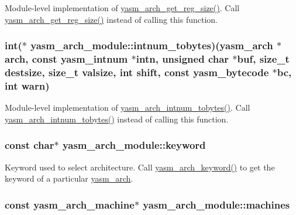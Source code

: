Module-\/level implementation of \hyperlink{arch_8h_a028fd6b5698ea232ca602915d067cd64}{yasm\-\_\-arch\-\_\-get\-\_\-reg\-\_\-size()}. Call \hyperlink{arch_8h_a028fd6b5698ea232ca602915d067cd64}{yasm\-\_\-arch\-\_\-get\-\_\-reg\-\_\-size()} instead of calling this function. \hypertarget{structyasm__arch__module_a07202501842115d0216311060c3ede71}{
\subsubsection[{intnum\-\_\-tobytes}]{\setlength{\rightskip}{0pt plus 5cm}int($\ast$ yasm\-\_\-arch\-\_\-module\-::intnum\-\_\-tobytes)({\bf yasm\-\_\-arch} $\ast$arch, const {\bf yasm\-\_\-intnum} $\ast$intn, unsigned char $\ast$buf, size\-\_\-t destsize, size\-\_\-t valsize, int shift, const {\bf yasm\-\_\-bytecode} $\ast$bc, int {\bf warn})}}\label{structyasm__arch__module_a07202501842115d0216311060c3ede71}
Module-\/level implementation of \hyperlink{arch_8h_a26af7f92b5ea9c7b9a663746de83de35}{yasm\-\_\-arch\-\_\-intnum\-\_\-tobytes()}. Call \hyperlink{arch_8h_a26af7f92b5ea9c7b9a663746de83de35}{yasm\-\_\-arch\-\_\-intnum\-\_\-tobytes()} instead of calling this function. \hypertarget{structyasm__arch__module_adb00b33e390ee35db27e80cf415b7404}{
\subsubsection[{keyword}]{\setlength{\rightskip}{0pt plus 5cm}const char$\ast$ yasm\-\_\-arch\-\_\-module\-::keyword}}\label{structyasm__arch__module_adb00b33e390ee35db27e80cf415b7404}
Keyword used to select architecture. Call \hyperlink{arch_8h_afb6a9a676fcc1d959f5dedf3632f3b79}{yasm\-\_\-arch\-\_\-keyword()} to get the keyword of a particular \hyperlink{coretype_8h_a8e0de61d73c940f0e7b6ef12e0dc1c70}{yasm\-\_\-arch}. \hypertarget{structyasm__arch__module_aa9831300bb203ec3cdb35862b6187ebc}{
\subsubsection[{machines}]{\setlength{\rightskip}{0pt plus 5cm}const {\bf yasm\-\_\-arch\-\_\-machine}$\ast$ yasm\-\_\-arch\-\_\-module\-::machines}}\label{structyasm__arch__module_aa9831300bb203ec3cdb35862b6187ebc}
